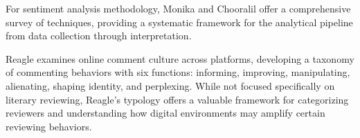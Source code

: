 \documentclass[journal,12pt,onecolumn,draftcls]{IEEEtran}
\begin{document}
For sentiment analysis methodology, Monika and Chooralil \cite{monika2023} offer a comprehensive survey of techniques, providing a systematic framework for the analytical pipeline from data collection through interpretation.

Reagle \cite{reagle2015} examines online comment culture across platforms, developing a taxonomy of commenting behaviors with six functions: informing, improving, manipulating, alienating, shaping identity, and perplexing. While not focused specifically on literary reviewing, Reagle's typology offers a valuable framework for categorizing reviewers and understanding how digital environments may amplify certain reviewing behaviors.

  
 
\end{document}
